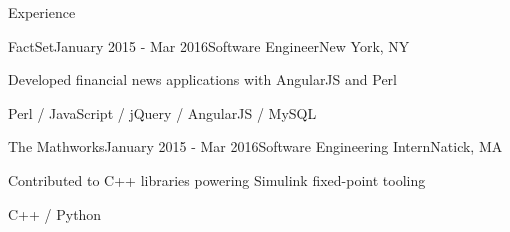\documentclass{resume} %
\begin{document}
\begin{rSection}{Experience}

\begin{rSubsection}{FactSet}{January 2015 - Mar 2016}{Software Engineer}{New York, NY}
\item Developed financial news applications with AngularJS and Perl

Perl / JavaScript / jQuery / AngularJS / MySQL
\end{rSubsection}


\begin{rSubsection}{The Mathworks}{January 2015 - Mar 2016}{Software Engineering Intern}{Natick, MA}
\item Contributed to C++ libraries powering Simulink fixed-point tooling

C++ / Python
\end{rSubsection}
\end{rSection}





\end{document}
